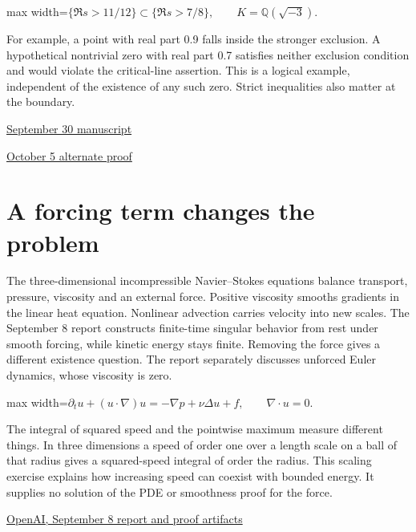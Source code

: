 \documentclass[11pt,oneside,openany]{book}
\begin{document}
\begin{center}\begin{adjustbox}{max width=\linewidth}$\displaystyle \{\Re s>11/12\}\subset\{\Re s>7/8\},\qquad K=\mathbb Q(\sqrt{-3}).$\end{adjustbox}\end{center}
For example, a point with real part 0.9 falls inside the stronger exclusion. A hypothetical nontrivial zero with real part 0.7 satisfies neither exclusion condition and would violate the critical-line assertion. This is a logical example, independent of the existence of any such zero. Strict inequalities also matter at the boundary.

{\small\sffamily\href{https://github.com/openai/math/tree/main/preprints/The-Quasi-Riemann-Hypothesis-September-30-2026}{September 30 manuscript}\par}
{\small\sffamily\href{https://github.com/openai/math/tree/main/preprints/The-Quasi-Riemann-Hypothesis-October-5-2026}{October 5 alternate proof}\par}
\section*{A forcing term changes the problem}
The three-dimensional incompressible Navier–Stokes equations balance transport, pressure, viscosity and an external force. Positive viscosity smooths gradients in the linear heat equation. Nonlinear advection carries velocity into new scales. The September 8 report constructs finite-time singular behavior from rest under smooth forcing, while kinetic energy stays finite. Removing the force gives a different existence question. The report separately discusses unforced Euler dynamics, whose viscosity is zero.

\begin{center}\begin{adjustbox}{max width=\linewidth}$\displaystyle \partial_t u+(u\cdot\nabla)u=-\nabla p+\nu\Delta u+f,\qquad \nabla\cdot u=0.$\end{adjustbox}\end{center}
The integral of squared speed and the pointwise maximum measure different things. In three dimensions a speed of order one over a length scale on a ball of that radius gives a squared-speed integral of order the radius. This scaling exercise explains how increasing speed can coexist with bounded energy. It supplies no solution of the PDE or smoothness proof for the force.

{\small\sffamily\href{https://openai.com/index/navier-stokes-solution/}{OpenAI, September 8 report and proof artifacts}\par}
\end{document}
